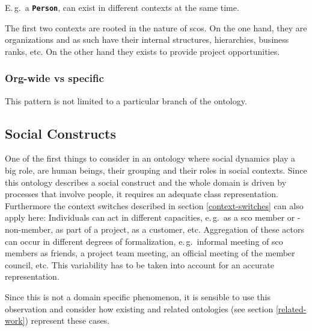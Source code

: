 \documentclass[a4paper, DIV=13, BCOR=0cm]{scrbook}
\newcommand{\eg}{e.\,g.\ }
\newcommand{\Eg}{E.\,g.\ }
\newcommand{\class}[1]{\texttt{\textbf{#1}}}
\begin{document}
\Eg a \class{Person}, can exist in different contexts at the same time.

The first two contexts are rooted in the nature of \glspl{sco}. On the one hand, they are organizations and as such have their internal structures, hierarchies, business ranks, etc. On the other hand they exists to provide project opportunities. 

\subsubsection{Org-wide vs specific}

This pattern is not limited to a particular branch of the ontology.

\subsection{Social Constructs }
One of the first things to consider in an ontology where social dynamics play a big role, are human beings, their grouping and their roles in social contexts. Since this ontology describes a social construct and the whole domain is driven by processes that involve people, it requires an adequate class representation. Furthermore the context switches described in section \ref{context-switches} can also apply here: Individuals can act in different capacities, \eg as a \gls{sco} member or -non-member, as part of a project, as a customer, etc. Aggregation of these actors can occur in different degrees of formalization, \eg informal meeting of \gls{sco} members as friends, a project team meeting, an official meeting of the member council, etc. This variability has to be taken into account for an accurate representation.

Since this is not a domain specific phenomenon, it is sensible to use this observation and consider how existing and related ontologies (see section \ref{related-work}) represent these cases.
\end{document}
